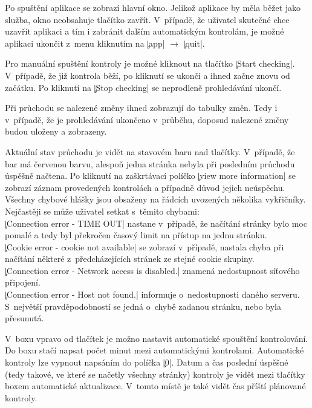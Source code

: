 Po spuštění aplikace se zobrazí hlavní okno.
Jelikož aplikace by měla běžet jako služba, okno neobsahuje tlačítko zavřít.
V~případě, že uživatel skutečné chce uzavřít aplikaci a tím i zabránit dalším automatickým kontrolám, je možné aplikaci ukončit z~menu kliknutím na \c|app| $\rightarrow$ \c|quit|.

Pro manuální spuštění kontroly je možné kliknout na tlačítko \c|Start checking|.
V~případě, že již kontrola běží, po kliknutí se ukončí a ihned začne znovu od začátku.
Po kliknutí na \c|Stop checking| se neprodleně prohledávání ukončí.

Při průchodu se nalezené změny ihned zobrazují do tabulky změn.
Tedy i v~případě, že je prohledávání ukončeno v~průběhu, doposud nalezené změny budou uloženy a zobrazeny.

Aktuální stav průchodu je vidět na stavovém baru  nad tlačítky.
V~případě, že bar má červenou barvu, alespoň jedna stránka nebyla při posledním průchodu úspěšně načtena.
Po kliknutí na zaškrtávací políčko \c|view more information| se zobrazí záznam provedených kontrolách a případně důvod jejich neúspěchu.
Všechny chybové hlášky jsou obsaženy na řádcích uvozených několika vykřičníky.
Nejčastěji se může uživatel setkat s~těmito chybami:\\
\c|Connection error - TIME OUT| nastane v~případě, že načítání stránky bylo moc pomalé a tedy byl překročen časový limit na přístup na jednu stránku.\\ %
\c|Cookie error - cookie not available| se zobrazí v~případě, nastala chyba při načítání některé z~předcházejících stránek ze stejné cookie skupiny.\\
\c|Connection error - Network access is disabled.| znamená nedostupnost síťového připojení.\\
\c|Connection error - Host not found.| informuje o~nedostupnosti daného serveru. S~největší pravděpodobností se  jedná o~chybě zadanou stránku, nebo byla přesunutá.

V~boxu vpravo od tlačítek je možno nastavit automatické spouštění kontrolování.
Do boxu stačí napsat počet minut mezi automatickými kontrolami.
Automatické kontroly lze vypnout napsáním do políčka \c|0|.
Datum a čas poslední úspěšné (tedy takové, ve které se načetly všechny stránky) kontroly je vidět mezi tlačítky boxem automatické aktualizace.
V~tomto místě je také vidět čas příští plánované kontroly.

